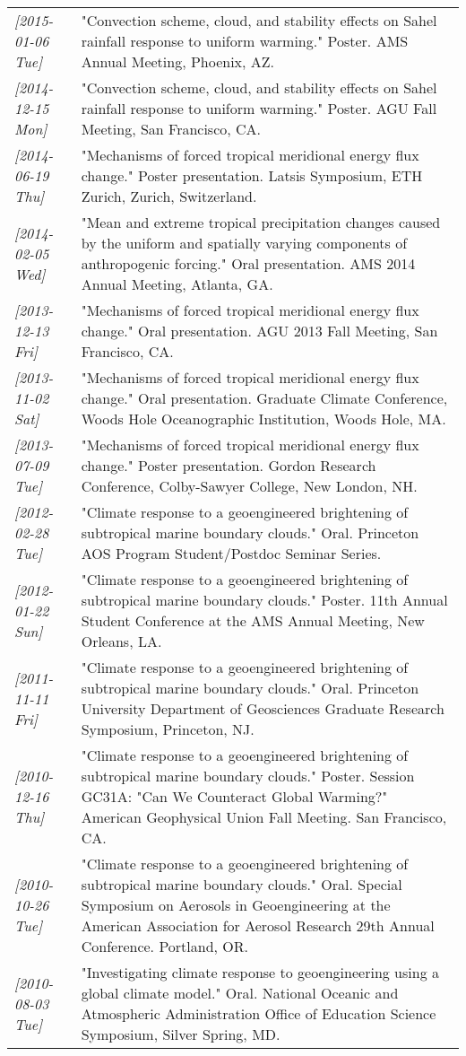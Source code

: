 \documentclass[12pt,letterpaper]{shillcv}
\begin{document}
\begin{center}
\begin{tabularx}{\textwidth}{lX}
\textit{[2015-01-06 Tue]} & "Convection scheme, cloud, and stability effects on Sahel rainfall response to uniform warming."  Poster.  AMS Annual Meeting, Phoenix, AZ.\\
\textit{[2014-12-15 Mon]} & "Convection scheme, cloud, and stability effects on Sahel rainfall response to uniform warming."  Poster.  AGU Fall Meeting, San Francisco, CA.\\
\textit{[2014-06-19 Thu]} & "Mechanisms of forced tropical meridional energy flux change."  Poster presentation.  Latsis Symposium, ETH Zurich, Zurich, Switzerland.\\
\textit{[2014-02-05 Wed]} & "Mean and extreme tropical precipitation changes caused by the uniform and spatially varying components of anthropogenic forcing."  Oral presentation.  AMS 2014 Annual Meeting, Atlanta, GA.\\
\textit{[2013-12-13 Fri]} & "Mechanisms of forced tropical meridional energy flux change."  Oral presentation.  AGU 2013 Fall Meeting, San Francisco, CA.\\
\textit{[2013-11-02 Sat]} & "Mechanisms of forced tropical meridional energy flux change."  Oral presentation.  Graduate Climate Conference, Woods Hole Oceanographic Institution, Woods Hole, MA.\\
\textit{[2013-07-09 Tue]} & "Mechanisms of forced tropical meridional energy flux change."  Poster presentation.  Gordon Research Conference, Colby-Sawyer College, New London, NH.\\
\textit{[2012-02-28 Tue]} & "Climate response to a geoengineered brightening of subtropical marine boundary clouds."  Oral.  Princeton AOS Program Student/Postdoc Seminar Series.\\
\textit{[2012-01-22 Sun]} & "Climate response to a geoengineered brightening of subtropical marine boundary clouds."  Poster.  11th Annual Student Conference at the AMS Annual Meeting, New Orleans, LA.\\
\textit{[2011-11-11 Fri]} & "Climate response to a geoengineered brightening of subtropical marine boundary clouds."  Oral.  Princeton University Department of Geosciences Graduate Research Symposium, Princeton, NJ.\\
\textit{[2010-12-16 Thu]} & "Climate response to a geoengineered brightening of subtropical marine boundary clouds."  Poster.  Session GC31A: "Can We Counteract Global Warming?" American Geophysical Union Fall Meeting.  San Francisco, CA.\\
\textit{[2010-10-26 Tue]} & "Climate response to a geoengineered brightening of subtropical marine boundary clouds."  Oral.  Special Symposium on Aerosols in Geoengineering at the American Association for Aerosol Research 29th Annual Conference.  Portland, OR.\\
\textit{[2010-08-03 Tue]} & "Investigating climate response to geoengineering using a global climate model."  Oral.  National Oceanic and Atmospheric Administration Office of Education Science Symposium, Silver Spring, MD.\\
\end{tabularx}
\end{center}
\end{document}
